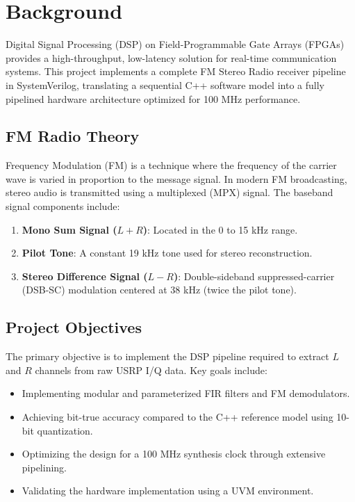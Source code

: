 \section{Background}

Digital Signal Processing (DSP) on Field-Programmable Gate Arrays (FPGAs) provides a high-throughput, low-latency solution for real-time communication systems. This project implements a complete FM Stereo Radio receiver pipeline in SystemVerilog, translating a sequential C++ software model into a fully pipelined hardware architecture optimized for 100 MHz performance.

\subsection{FM Radio Theory}
Frequency Modulation (FM) is a technique where the frequency of the carrier wave is varied in proportion to the message signal. In modern FM broadcasting, stereo audio is transmitted using a multiplexed (MPX) signal. The baseband signal components include:
\begin{enumerate}
    \item \textbf{Mono Sum Signal ($L+R$)}: Located in the 0 to 15 kHz range.
    \item \textbf{Pilot Tone}: A constant 19 kHz tone used for stereo reconstruction.
    \item \textbf{Stereo Difference Signal ($L-R$)}: Double-sideband suppressed-carrier (DSB-SC) modulation centered at 38 kHz (twice the pilot tone).
\end{enumerate}

\subsection{Project Objectives}
The primary objective is to implement the DSP pipeline required to extract $L$ and $R$ channels from raw USRP I/Q data. Key goals include:
\begin{itemize}
    \item Implementing modular and parameterized FIR filters and FM demodulators.
    \item Achieving bit-true accuracy compared to the C++ reference model using 10-bit quantization.
    \item Optimizing the design for a 100 MHz synthesis clock through extensive pipelining.
    \item Validating the hardware implementation using a UVM environment.
\end{itemize}
